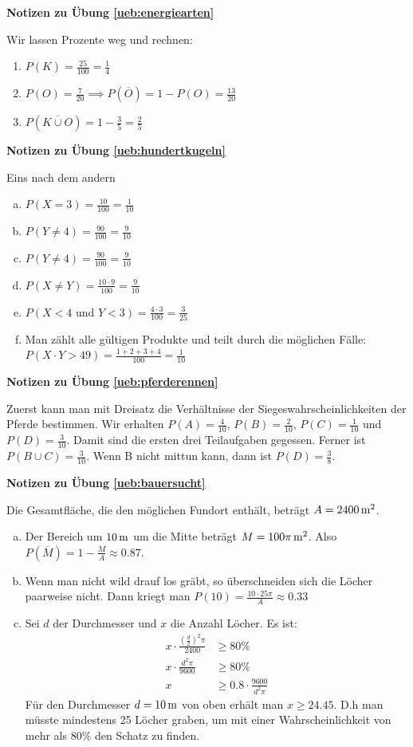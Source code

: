 \documentclass[%
<<<<<<< Updated upstream
<<<<<<< Updated upstream
11pt,%
twoside,%
titlepage,%
german,%
=======
=======
>>>>>>> Stashed changes
11pt,%
twoside,%
titlepage,%
swissgerman,%
<<<<<<< Updated upstream
>>>>>>> Stashed changes
=======
>>>>>>> Stashed changes
headsepline%
]{scrartcl}
\newcommand{\faReturnGray}{\textcolor{gray}{\faMailReply}} %
\theoremstyle{definition}
\theoremstyle{plain}
\newcommand{\concatueb}[1]{ueb:#1}%
\newcommand{\concatlsg}[1]{lsg:#1}%
\newenvironment{lsg}[1]{%
    \par\noindent\textbf{Notizen zu Übung \ref{\concatueb{#1}}}\label{\concatlsg{#1}}
    \hfill\hyperref[\concatueb{#1}]{\faReturnGray}\par %
}{%
    \par%
}
\newcommand{\concatueb}[1]{ueb:#1}%
\newcommand{\concatlsg}[1]{lsg:#1}%
\newenvironment{lsg}[1]{%
    \par\noindent\textbf{Notizen zu Übung \ref{\concatueb{#1}}.}%
    \label{\concatlsg{#1}}
}{%
    \par%
}
\begin{document}
\begin{lsg}{energiearten}
Wir lassen Prozente weg und rechnen:
\begin{enumerate}
\item $P(K)=\frac{25}{100}=\frac{1}{4}$
\item $P(O)=\frac{7}{20}\implies P(\overline{O})=1-P(O)=\frac{13}{20}$
\item $P(\overline{K\cup O})=1-\frac{3}{5}=\frac{2}{5}$
\end{enumerate}
\end{lsg}

\begin{lsg}{hundertkugeln}
Eins nach dem andern
\begin{enumerate}[a)]
\item $P(X=3)=\frac{10}{100}=\frac{1}{10}$
\item $P(Y\neq4)=\frac{90}{100}=\frac{9}{10}$
\item $P(Y\neq4)=\frac{90}{100}=\frac{9}{10}$
\item $P(X \neq Y)=\frac{10\cdot9}{100}=\frac{9}{10}$
\item $P(X < 4\text{ und } Y < 3)=\frac{4\cdot 3}{100}=\frac{3}{25}$
\item Man z\"ahlt alle g\"ultigen Produkte und teilt durch die m\"oglichen F\"alle: $P(X\cdot Y > 49)=\frac{1+2+3+4}{100}=\frac{1}{10}$
\end{enumerate}
\end{lsg}

\begin{lsg}{pferderennen}
Zuerst kann man mit Dreisatz die Verh\"altnisse der Siegeswahrscheinlichkeiten der Pferde bestimmen. Wir erhalten $P(A)=\frac{4}{10}$, $P(B)=\frac{2}{10}$, $P(C)=\frac{1}{10}$ und $P(D)=\frac{3}{10}$. Damit sind die ersten drei Teilaufgaben gegessen. Ferner ist $P(B\cup C)=\frac{3}{10}$. Wenn B nicht mittun kann, dann ist $P(D)=\frac{3}{8}$.
\end{lsg}

\begin{lsg}{bauersucht}
Die Gesamtfl\"ache, die den m\"oglichen Fundort enth\"alt, betr\"agt $A=\unit[2400]{m^{2}}$.
\begin{enumerate}[a)]
\item Der Bereich um $\unit[10]{m}$ um die Mitte betr\"agt $M=\unit[100\pi]{m^{2}}$. Also $P(\overline{M})=1-\frac{M}{A}\approx0.87$.
\item Wenn man nicht wild drauf los gr\"abt, so \"uberschneiden sich die L\"ocher paarweise nicht. Dann kriegt man $P(10)=\frac{10\cdot25\pi}{A}\approx0.33$
\item Sei $d$ der Durchmesser und $x$ die Anzahl L\"ocher. Es ist:
\begin{align*}
x\cdot\frac{(\frac{d}{2})^{2}\pi}{2400} &\geq80\%\\
x\cdot\frac{d^{2}\pi}{9600} &\geq80\%\\
x &\geq 0.8\cdot\frac{9600}{d^{2}\pi}
\end{align*}
F\"ur den Durchmesser $d=\unit[10]{m}$ von oben erh\"alt man $x\geq24.45$. D.h man m\"usste mindestens 25 L\"ocher graben, um mit einer Wahrscheinlichkeit von mehr als $80\%$ den Schatz zu finden.
\end{enumerate}
\end{lsg}
\end{document}
